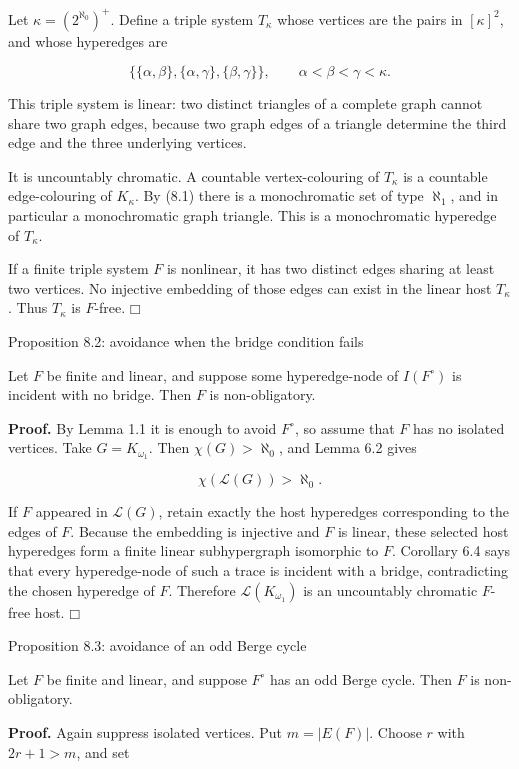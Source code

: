 \documentclass[11pt]{article}
\providecommand{\square}{\mdlgwhtsquare}
\begin{document}
Let \(\kappa=(2^{\aleph_0})^+\). Define a triple system \(T_\kappa\) whose vertices are the pairs in \([\kappa]^2\), and whose hyperedges are

\[
\bigl\{
\{\alpha,\beta\},
\{\alpha,\gamma\},
\{\beta,\gamma\}
\bigr\},
\qquad \alpha<\beta<\gamma<\kappa.
\]

This triple system is linear: two distinct triangles of a complete graph cannot share two graph edges, because two graph edges of a triangle determine the third edge and the three underlying vertices.

It is uncountably chromatic. A countable vertex-colouring of \(T_\kappa\) is a countable edge-colouring of \(K_\kappa\). By (8.1) there is a monochromatic set of type \(\aleph_1\), and in particular a monochromatic graph triangle. This is a monochromatic hyperedge of \(T_\kappa\).

If a finite triple system \(F\) is nonlinear, it has two distinct edges sharing at least two vertices. No injective embedding of those edges can exist in the linear host \(T_\kappa\). Thus \(T_\kappa\) is \(F\)-free. \(\square\)

\label{proposition-8.2-avoidance-when-the-bridge-condition-fails}
\begin{propositionbox}{Proposition 8.2: avoidance when the bridge condition fails}

Let \(F\) be finite and linear, and suppose some hyperedge-node of \(I(F^\circ)\) is incident with no bridge. Then \(F\) is non-obligatory.

\end{propositionbox}
\textbf{Proof.} By Lemma 1.1 it is enough to avoid \(F^\circ\), so assume that \(F\) has no isolated vertices. Take \(G=K_{\omega_1}\). Then \(\chi(G)>\aleph_0\), and Lemma 6.2 gives

\[
\chi(\mathcal L(G))>\aleph_0.
\]

If \(F\) appeared in \(\mathcal L(G)\), retain exactly the host hyperedges corresponding to the edges of \(F\). Because the embedding is injective and \(F\) is linear, these selected host hyperedges form a finite linear subhypergraph isomorphic to \(F\). Corollary 6.4 says that every hyperedge-node of such a trace is incident with a bridge, contradicting the chosen hyperedge of \(F\). Therefore \(\mathcal L(K_{\omega_1})\) is an uncountably chromatic \(F\)-free host. \(\square\)

\label{proposition-8.3-avoidance-of-an-odd-berge-cycle}
\begin{propositionbox}{Proposition 8.3: avoidance of an odd Berge cycle}

Let \(F\) be finite and linear, and suppose \(F^\circ\) has an odd Berge cycle. Then \(F\) is non-obligatory.

\end{propositionbox}
\textbf{Proof.} Again suppress isolated vertices. Put \(m=|E(F)|\). Choose \(r\) with \(2r+1>m\), and set
\end{document}
